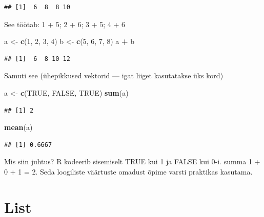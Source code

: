 \documentclass[]{book}
\newenvironment{Shaded}{\begin{snugshade}}{\end{snugshade}}
\newcommand{\KeywordTok}[1]{\textcolor[rgb]{0.13,0.29,0.53}{\textbf{#1}}}
\newcommand{\DecValTok}[1]{\textcolor[rgb]{0.00,0.00,0.81}{#1}}
\newcommand{\StringTok}[1]{\textcolor[rgb]{0.31,0.60,0.02}{#1}}
\newcommand{\OtherTok}[1]{\textcolor[rgb]{0.56,0.35,0.01}{#1}}
\newcommand{\OperatorTok}[1]{\textcolor[rgb]{0.81,0.36,0.00}{\textbf{#1}}}
\newcommand{\NormalTok}[1]{#1}
\begin{document}
\begin{verbatim}
## [1]  6  8  8 10
\end{verbatim}

See töötab: 1 + 5; 2 + 6; 3 + 5; 4 + 6

\begin{Shaded}
\begin{Highlighting}[]
\NormalTok{a <-}\StringTok{ }\KeywordTok{c}\NormalTok{(}\DecValTok{1}\NormalTok{, }\DecValTok{2}\NormalTok{, }\DecValTok{3}\NormalTok{, }\DecValTok{4}\NormalTok{)}
\NormalTok{b <-}\StringTok{ }\KeywordTok{c}\NormalTok{(}\DecValTok{5}\NormalTok{, }\DecValTok{6}\NormalTok{, }\DecValTok{7}\NormalTok{, }\DecValTok{8}\NormalTok{) }
\NormalTok{a }\OperatorTok{+}\StringTok{ }\NormalTok{b}
\end{Highlighting}
\end{Shaded}

\begin{verbatim}
## [1]  6  8 10 12
\end{verbatim}

Samuti see (ühepikkused vektorid --- igat liiget kasutatakse üks kord)

\begin{Shaded}
\begin{Highlighting}[]
\NormalTok{a <-}\StringTok{ }\KeywordTok{c}\NormalTok{(}\OtherTok{TRUE}\NormalTok{, }\OtherTok{FALSE}\NormalTok{, }\OtherTok{TRUE}\NormalTok{)}
\KeywordTok{sum}\NormalTok{(a)}
\end{Highlighting}
\end{Shaded}

\begin{verbatim}
## [1] 2
\end{verbatim}

\begin{Shaded}
\begin{Highlighting}[]
\KeywordTok{mean}\NormalTok{(a)}
\end{Highlighting}
\end{Shaded}

\begin{verbatim}
## [1] 0.6667
\end{verbatim}

Mis siin juhtus? R kodeerib sisemiselt TRUE kui 1 ja FALSE kui 0-i.
summa 1 + 0 + 1 = 2. Seda loogiliste väärtuste omadust õpime varsti
praktikas kasutama.

\section{List}\label{list}
\end{document}

